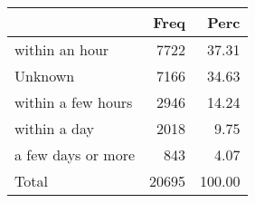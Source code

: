 
\begin{tabular}[t]{lrr}
\toprule
  & Freq & Perc\\
\midrule
within an hour & 7722 & 37.31\\
Unknown & 7166 & 34.63\\
within a few hours & 2946 & 14.24\\
within a day & 2018 & 9.75\\
a few days or more & 843 & 4.07\\
\addlinespace
Total & 20695 & 100.00\\
\bottomrule
\end{tabular}